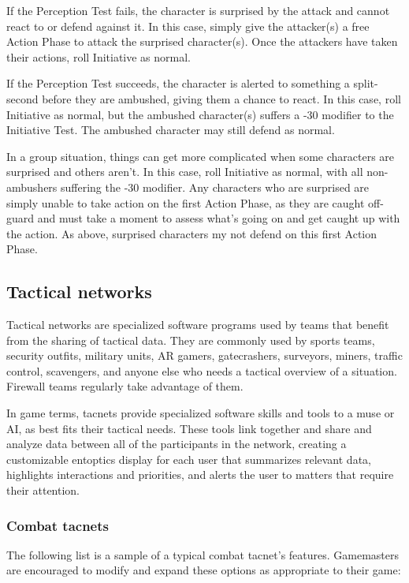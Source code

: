 If the Perception Test fails, the character is surprised by the attack and cannot react to or defend against it. In this case, simply give the attacker(s) a free Action Phase to attack the surprised character(s). Once the attackers have taken their actions, roll Initiative as normal. 

If the Perception Test succeeds, the character is alerted to something a split-second before they are ambushed, giving them a chance to react. In this case, roll Initiative as normal, but the ambushed character(s) suffers a -30 modifier to the Initiative Test. The ambushed character may still defend as normal. 

In a group situation, things can get more complicated when some characters are surprised and others aren’t. In this case, roll Initiative as normal, with all non-ambushers suffering the -30 modifier. Any characters who are surprised are simply unable to take action on the first Action Phase, as they are caught off-guard and must take a moment to assess what’s going on and get caught up with the action. As above, surprised characters my not defend on this first Action Phase. 



\subsection{Tactical networks} \label{sec:tactical-networks} 

Tactical networks are specialized software programs used by teams that benefit from the sharing of tactical data. They are commonly used by sports teams, security outfits, military units, AR gamers, gatecrashers, surveyors, miners, traffic control, scavengers, and anyone else who needs a tactical overview of a situation. Firewall teams regularly take advantage of them. 

In game terms, tacnets provide specialized software skills and tools to a muse or AI, as best fits their tactical needs. These tools link together and share and analyze data between all of the participants in the network, creating a customizable entoptics display for each user that summarizes relevant data, highlights interactions and priorities, and alerts the user to matters that require their attention. 

\subsubsection{Combat tacnets} The following list is a sample of a typical combat tacnet’s features. Gamemasters are encouraged to modify and expand these options as appropriate to their game: 

